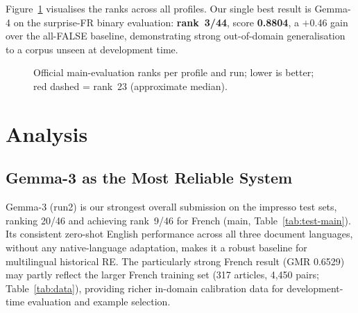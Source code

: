 \documentclass[
]{ceurart}
\theoremstyle{definition}
\begin{document}
Figure~\ref{fig:ranks} visualises the ranks across all profiles.
Our single best result is Gemma-4 on the surprise-FR binary evaluation: \textbf{rank~3/44}, score \textbf{0.8804}, a $+$0.46 gain over the all-FALSE baseline, demonstrating strong out-of-domain generalisation to a corpus unseen at development time.

\begin{figure}[t]
\centering
{}
\caption{Official main-evaluation ranks per profile and run; lower is better; red dashed = rank~23 (approximate median).}
\label{fig:ranks}
\end{figure}


\section{Analysis}
\label{sec:analysis}

\subsection{Gemma-3 as the Most Reliable System}

Gemma-3 (run2) is our strongest overall submission on the impresso test sets, ranking 20/46 and achieving rank~9/46 for French (main, Table~\ref{tab:test-main}).
Its consistent zero-shot English performance across all three document languages, without any native-language adaptation, makes it a robust baseline for multilingual historical RE.
The particularly strong French result (GMR 0.6529) may partly reflect the larger French training set (317 articles, 4,450 pairs; Table~\ref{tab:data}), providing richer in-domain calibration data for development-time evaluation and example selection.
\end{document}
